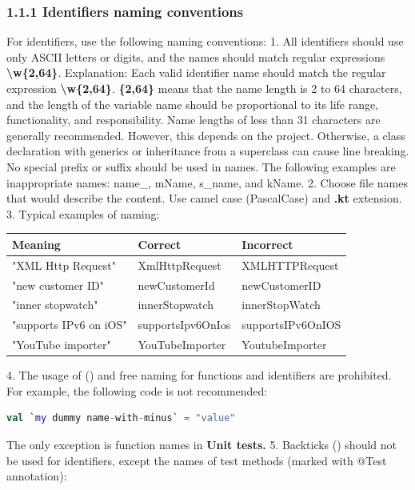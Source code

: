 \subsubsection*{\textbf{1.1.1 Identifiers naming conventions}}
\leavevmode\newline
\label{sec:1.1.1}
For identifiers, use the following naming conventions:
1.	All identifiers should use only ASCII letters or digits, and the names should match regular expressions \textbf{\textbackslash w\{2,64\}}.
Explanation: Each valid identifier name should match the regular expression \textbf{\textbackslash w\{2,64\}}.
\textbf{\{2,64\}} means that the name length is 2 to 64 characters, and the length of the variable name should be proportional to its life range, functionality, and responsibility.
Name lengths of less than 31 characters are generally recommended. However, this depends on the project. Otherwise, a class declaration with generics or inheritance from a superclass can cause line breaking.
No special prefix or suffix should be used in names. The following examples are inappropriate names: name\_, mName, s\_name, and kName.
2.	Choose file names that would describe the content. Use camel case (PascalCase) and \textbf{.kt} extension.
3.	Typical examples of naming:
\begin{center}
\begin{tabular}{ |p{5.0cm}|p{5.0cm}|p{5.0cm}| }
\hline
Meaning&Correct&Incorrect\\
\hline
 "XML Http Request" & XmlHttpRequest & XMLHTTPRequest \\
 "new customer ID" & newCustomerId & newCustomerID \\
 "inner stopwatch" & innerStopwatch & innerStopWatch \\
 "supports IPv6 on iOS" & supportsIpv6OnIos & supportsIPv6OnIOS \\
 "YouTube importer" & YouTubeImporter & YoutubeImporter \\
\hline
\end{tabular}
\end{center}
4.	The usage of (\textbf{}) and free naming for functions and identifiers are prohibited. For example, the following code is not recommended:
\begin{lstlisting}[language=Kotlin]
val `my dummy name-with-minus` = "value" 
\end{lstlisting}
The only exception is function names in \textbf{Unit tests.}
5.	Backticks (\textbf{}) should not be used for identifiers, except the names of test methods (marked with @Test annotation):
